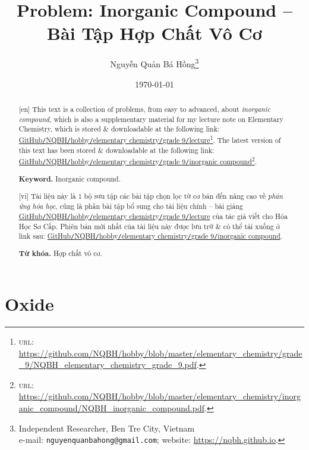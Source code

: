 \documentclass{article}
\title{Problem: Inorganic Compound -- Bài Tập Hợp Chất Vô Cơ}
\author{Nguyễn Quản Bá Hồng\footnote{Independent Researcher, Ben Tre City, Vietnam\\e-mail: \texttt{nguyenquanbahong@gmail.com}; website: \url{https://nqbh.github.io}.}}
\date{\today}
\begin{document}
\maketitle
\begin{abstract}
	\textsf{[en]} This text is a collection of problems, from easy to advanced, about \textit{inorganic compound}, which is also a supplementary material for my lecture note on Elementary Chemistry, which is stored \& downloadable at the following link: \href{https://github.com/NQBH/hobby/blob/master/elementary_chemistry/grade_9/NQBH_elementary_chemistry_grade_9.pdf}{GitHub\texttt{/}NQBH\texttt{/}hobby\texttt{/}elementary chemistry\texttt{/}grade 9\texttt{/}lecture}\footnote{\textsc{url}: \url{https://github.com/NQBH/hobby/blob/master/elementary_chemistry/grade_9/NQBH_elementary_chemistry_grade_9.pdf}.}. The latest version of this text has been stored \& downloadable at the following link: \href{https://github.com/NQBH/hobby/blob/master/elementary_chemistry/inorganic_compound/NQBH_inorganic_compound.pdf}{GitHub\texttt{/}NQBH\texttt{/}hobby\texttt{/}elementary chemistry\texttt{/}grade 9\texttt{/}inorganic compound}\footnote{\textsc{url}: \url{https://github.com/NQBH/hobby/blob/master/elementary_chemistry/inorganic_compound/NQBH_inorganic_compound.pdf}.}.
	
	\textsf{\textbf{Keyword.} Inorganic compound.}
	\vspace{2mm}
	
	\textsf{[vi]} Tài liệu này là 1 bộ sưu tập các bài tập chọn lọc từ cơ bản đến nâng cao về \textit{phản ứng hóa học}, cũng là phần bài tập bổ sung cho tài liệu chính -- bài giảng \href{https://github.com/NQBH/hobby/blob/master/elementary_chemistry/grade_9/NQBH_elementary_chemistry_grade_9.pdf}{GitHub\texttt{/}NQBH\texttt{/}hobby\texttt{/}elementary chemistry\texttt{/}grade 9\texttt{/}lecture} của tác giả viết cho Hóa Học Sơ Cấp. Phiên bản mới nhất của tài liệu này được lưu trữ \& có thể tải xuống ở link sau: \href{https://github.com/NQBH/hobby/blob/master/elementary_chemistry/grade_9/real/NQBH_real.pdf}{GitHub\texttt{/}NQBH\texttt{/}hobby\texttt{/}elementary chemistry\texttt{/}grade 9\texttt{/}inorganic compound}.
	
	\textsf{\textbf{Từ khóa.} Hợp chất vô cơ.}
\end{abstract}
\setcounter{secnumdepth}{4}
\setcounter{tocdepth}{3}
\tableofcontents
\newpage


\section{Oxide}
\end{document}
